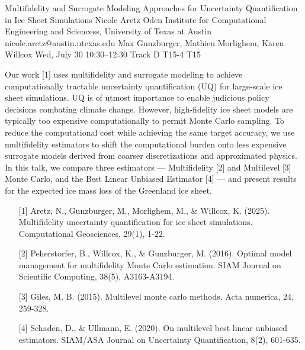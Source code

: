 \begin{talk}
  {Multifidelity and Surrogate Modeling Approaches for Uncertainty Quantification in Ice Sheet Simulations}%
  {Nicole Aretz}%
  {Oden Institute for Computational Engineering and Sciencess, University of Texas at Austin}%
  {nicole.aretz@austin.utexas.edu}%
  {Max Gunzburger, Mathieu Morlighem, Karen Willcox}%
  {}%
  {Wed, July 30 10:30–12:30 Track D}%
  {T15-4}%
  {T15}%
  
				
			
Our work [1] uses multifidelity and surrogate modeling to achieve computationally tractable uncertainty quantification (UQ) for large-scale ice sheet simulations. UQ is of utmost importance to enable judicious policy decisions combating climate change. However, high-fidelity ice sheet models are typically too expensive computationally to permit Monte Carlo sampling. To reduce the computational cost while achieving the same target accuracy, we use multifidelity estimators to shift the computational burden onto less expensive surrogate models derived from coarser discretizations and approximated physics. In this talk, we compare three estimators — Multifidelity [2] and Multilevel [3] Monte Carlo, and the Best Linear Unbiased Estimator [4] — and present results for the expected ice mass loss of the Greenland ice sheet.

\medskip

\begin{enumerate}
	\item[{[1]}] Aretz, N., Gunzburger, M., Morlighem, M., \& Willcox, K. (2025). Multifidelity uncertainty quantification for ice sheet simulations. Computational Geosciences, 29(1), 1-22.
	\item[{[2]}] Peherstorfer, B., Willcox, K., \& Gunzburger, M. (2016). Optimal model management for multifidelity Monte Carlo estimation. SIAM Journal on Scientific Computing, 38(5), A3163-A3194.
    \item[{[3]}] Giles, M. B. (2015). Multilevel monte carlo methods. Acta numerica, 24, 259-328.
    \item[{[4]}] Schaden, D., \& Ullmann, E. (2020). On multilevel best linear unbiased estimators. SIAM/ASA Journal on Uncertainty Quantification, 8(2), 601-635.
\end{enumerate}

\end{talk}

